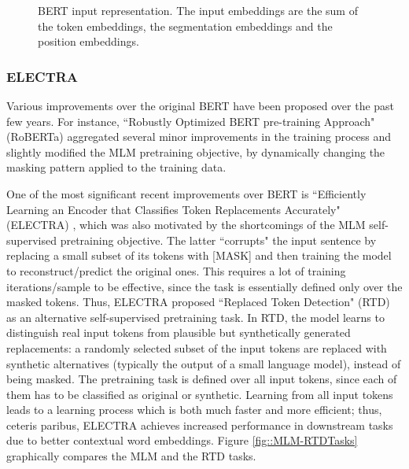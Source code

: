 \documentclass[preprint,review,10pt]{elsarticle}
\begin{document}
	
	\begin{figure}
		\centering
		
		\caption{BERT input representation. The input embeddings are the sum of the token embeddings, the segmentation embeddings and the position embeddings.}
		\label{fig::BERTInput}
	\end{figure}
	
	\subsubsection{ELECTRA}
	Various improvements over the original BERT have been proposed over the past few years. For instance, ``Robustly Optimized BERT pre-training Approach" (RoBERTa) \cite{roberta} aggregated several minor improvements in the training process and slightly modified the MLM pretraining objective, by dynamically changing the masking pattern applied to the training data.
	
	One of the most significant recent improvements over BERT is ``Efficiently Learning an Encoder that Classifies Token Replacements Accurately" (ELECTRA) \cite{karta}, which was also motivated by the shortcomings of the MLM self-supervised pretraining objective. The latter ``corrupts" the input sentence by replacing a small subset of its tokens with [MASK] and then training the model to reconstruct/predict the original ones. This requires a lot of training iterations/sample to be effective, since the task is essentially defined only over the masked tokens. Thus, ELECTRA proposed ``Replaced Token Detection" (RTD) as an alternative self-supervised pretraining task. In RTD, the model learns to distinguish real input tokens from plausible but synthetically generated replacements: a randomly selected subset of the input tokens are replaced with synthetic alternatives (typically the output of a small language model), instead of being masked. The pretraining task is defined over all input tokens, since each of them has to be classified as original or synthetic. Learning from all input tokens leads to a learning process which is both much faster and more efficient; thus, ceteris paribus, ELECTRA achieves increased performance in downstream tasks due to better contextual word embeddings. Figure \ref{fig::MLM-RTDTasks} graphically compares the MLM and the RTD tasks.
	
\end{document}
